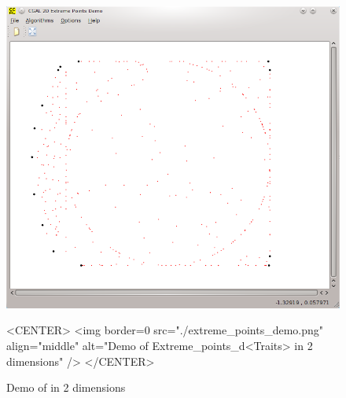 \begin{figure}[htbp]
\begin{ccTexOnly}
\begin{center}
\includegraphics[width=\textwidth]{Extreme_points_d/extreme_points_demo.png}
\end{center}
\end{ccTexOnly}
\caption{Demo of  in 2 dimensions}
\label{Extreme_points_demo}
\begin{ccHtmlOnly}
<CENTER>
<img border=0 src="./extreme_points_demo.png" align="middle" alt="Demo of Extreme_points_d<Traits> in 2 dimensions" />
</CENTER>
\end{ccHtmlOnly}
\end{figure}

